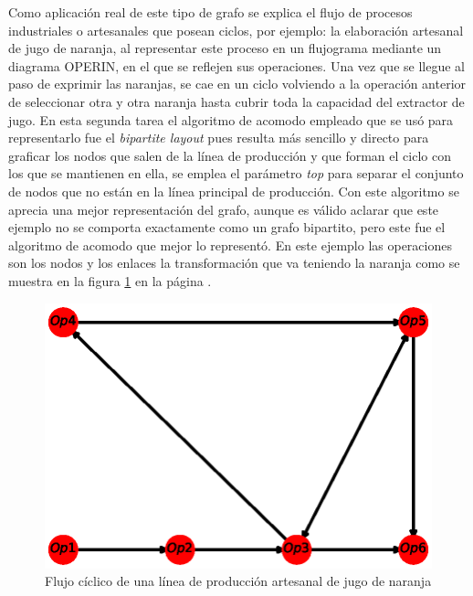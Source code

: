 \documentclass{article}
\begin{document}
Como aplicación real de este tipo de grafo se explica el flujo de procesos industriales o artesanales que posean ciclos, por ejemplo: la elaboración artesanal de jugo de naranja, al representar este proceso en un flujograma mediante un diagrama OPERIN, en el que se reflejen sus operaciones. Una vez que se llegue al paso de exprimir las naranjas, se cae en un ciclo volviendo a la operación anterior de seleccionar otra y otra naranja hasta cubrir toda la capacidad del extractor de jugo. En esta segunda tarea el algoritmo de acomodo empleado que se usó para representarlo fue el \textit{bipartite layout} pues resulta más sencillo y directo para graficar los nodos que salen de la línea de producción y que forman el ciclo con los que se mantienen en ella, se emplea el parámetro \textit{top} para separar el conjunto de nodos que no están en la línea principal de producción. Con este algoritmo se aprecia una mejor representación del grafo, aunque es válido aclarar que este ejemplo no se comporta exactamente como un grafo bipartito, pero este fue el algoritmo de acomodo que mejor lo representó. En este ejemplo las operaciones son los nodos  y los enlaces la transformación que va teniendo la naranja como se muestra en la figura \ref{fig:Fig05} en la página \pageref{fig:Fig05}.

\newpage


\begin{figure}[htbp]
    \centering
    \includegraphics[scale=0.6]{imagenes1/Fig05.eps}
    \caption{Flujo cíclico de una línea de producción artesanal de jugo de naranja}
    \label{fig:Fig05}
\end{figure}
\end{document}
